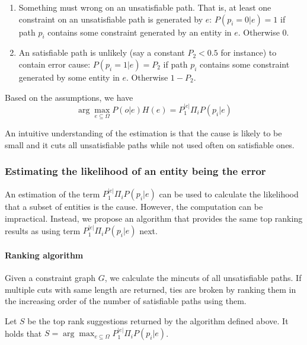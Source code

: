 \begin{enumerate}
\item Something must wrong on an unsatisfiable path. That is, at least
one constraint on an unsatisfiable path is generated by $e$:
$P(p_i=0|e) = 1$ if path $p_i$ contains some constraint generated by
an entity in $e$.  Otherwise 0.

\item An satisfiable path is unlikely (say a constant $P_2<0.5$ for instance)
to contain error cause: $P(p_i=1|e) = P_2$ if path $p_i$ contains some
constraint generated by some entity in $e$.  Otherwise $1-P_2$.  
\end{enumerate}

Based on the assumptions, we have
\[\arg\max_{e \subseteq \Omega} P(o|e) H(e) = P_1^{|e|} \Pi_i P(p_i|e) \]

An intuitive understanding of the estimation is that the cause is likely to be
small and it cuts all unsatisfiable paths while not used often on satisfiable ones.

\subsubsection{Estimating the likelihood of an entity being the error}
\label{sec:rankingalg}

An estimation of the term $P_1^{|e|} \Pi_i P(p_i|e)$ can be used to
calculate the likelihood that a subset of entities is the cause.
However, the computation can be impractical. Instead, we propose an
algorithm that provides the same top ranking results as using term
$P_1^{|e|} \Pi_i P(p_i|e)$ next.

\paragraph{Ranking algorithm}

Given a constraint graph $G$, we calculate the mincuts of all unsatisfiable
paths. If multiple cuts with same length are returned, ties are broken by
ranking them in the increasing order of the number of satisfiable paths using
them.

\begin{Theorem}
Let $S$ be the top rank suggestions returned by the algorithm defined above.
It holds that $S = \arg\max_{e\subseteq \Omega}P_1^{|e|} \Pi_i P(p_i|e)$.  
\end{Theorem}

